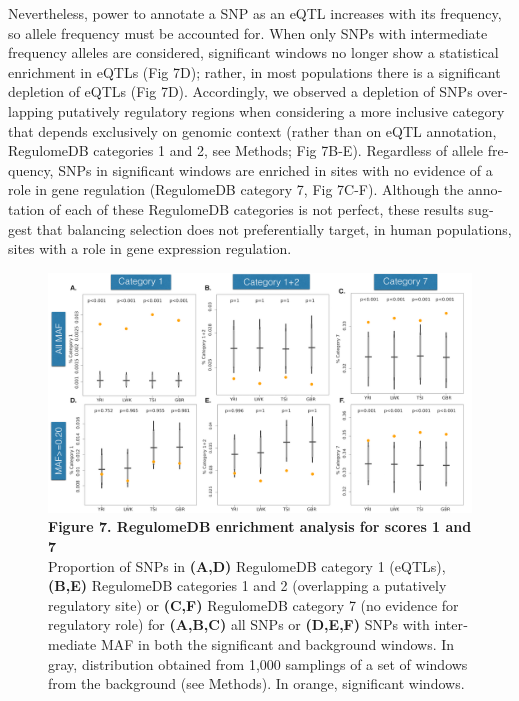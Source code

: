 \begin{refsection}
\begin{otherlanguage}{english}
Nevertheless, power to annotate a SNP as an eQTL increases with its frequency, so allele frequency must be accounted for. When only SNPs with intermediate frequency alleles are considered, significant windows no longer show a statistical enrichment in eQTLs (Fig 7D); rather, in most populations there is a significant depletion of eQTLs (Fig 7D). Accordingly, we observed a depletion of SNPs overlapping putatively regulatory regions when considering a more inclusive category that depends exclusively on genomic context (rather than on eQTL annotation, RegulomeDB categories 1 and 2, see Methods; Fig 7B-E). Regardless of allele frequency, SNPs in significant windows are enriched in sites with no evidence of a role in gene regulation (RegulomeDB category 7, Fig 7C-F). Although the annotation of each of these RegulomeDB categories is not perfect, these results suggest that balancing selection does not preferentially target, in human populations, sites with a role in gene expression regulation. 
\begin{figure}
\centering
\includegraphics[]{chap2_folder/Figures/Fig7.tiff}
\caption*{\textbf{Figure 7. RegulomeDB enrichment analysis for scores 1 and 7}\\
Proportion of SNPs in \textbf{(A,D)} RegulomeDB category 1 (eQTLs), \textbf{(B,E)} RegulomeDB categories 1 and 2 (overlapping a putatively regulatory site) or \textbf{(C,F)} RegulomeDB category 7 (no evidence for regulatory role) for \textbf{(A,B,C)} all SNPs or \textbf{(D,E,F)} SNPs with intermediate MAF in both the significant and background windows. In gray, distribution obtained from 1,000 samplings of a set of windows from the background (see Methods). In orange, significant windows. 
}
\end{figure}



\end{otherlanguage}
\end{refsection}
